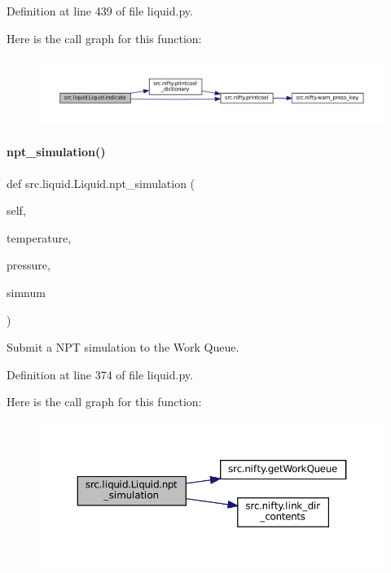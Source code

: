 Definition at line 439 of file liquid.\+py.

Here is the call graph for this function\+:
\nopagebreak
\begin{figure}[H]
\begin{center}
\leavevmode
\includegraphics[width=350pt]{classsrc_1_1liquid_1_1Liquid_a2d50c22b2cf9632ab7bebb415ef5028b_cgraph}
\end{center}
\end{figure}
\mbox{\label{classsrc_1_1liquid_1_1Liquid_a7ce7650a951da8f4c44c13a55b831719}} 
\paragraph{\texorpdfstring{npt\+\_\+simulation()}{npt\_simulation()}}
{\footnotesize\ttfamily def src.\+liquid.\+Liquid.\+npt\+\_\+simulation (\begin{DoxyParamCaption}\item[{}]{self,  }\item[{}]{temperature,  }\item[{}]{pressure,  }\item[{}]{simnum }\end{DoxyParamCaption})}



Submit a N\+PT simulation to the Work Queue. 



Definition at line 374 of file liquid.\+py.

Here is the call graph for this function\+:
\nopagebreak
\begin{figure}[H]
\begin{center}
\leavevmode
\includegraphics[width=350pt]{classsrc_1_1liquid_1_1Liquid_a7ce7650a951da8f4c44c13a55b831719_cgraph}
\end{center}
\end{figure}
\mbox{\label{classsrc_1_1liquid_1_1Liquid_aadcc3367e376135de20c3e1dc60d6e1e}} 
